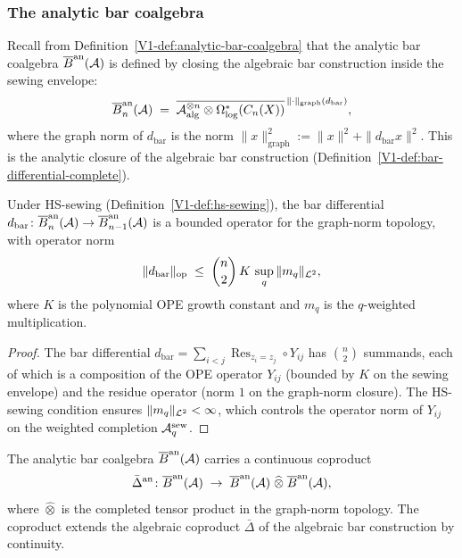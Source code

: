 \subsubsection{The analytic bar coalgebra}

\begin{definition}%
%
Recall from Definition~\ref{V1-def:analytic-bar-coalgebra} that the
analytic bar coalgebra $\overline{B}^{\mathrm{an}}(\mathcal{A})$ is defined by closing
the algebraic bar construction inside the sewing envelope:
\[
\overline{B}^{\mathrm{an}}_n(\mathcal{A})
\;=\;
\overline{
\mathcal{A}_{\mathrm{alg}}^{\otimes n}
\otimes \Omega^*_{\log}(C_n(X))
}^{\,\|\cdot\|_{\mathrm{graph}}(d_{\mathrm{bar}})},
\]
where the graph norm of $d_{\mathrm{bar}}$ is the norm
$\|x\|_{\mathrm{graph}}^2 := \|x\|^2 + \|d_{\mathrm{bar}} x\|^2$.
This is the analytic closure of the algebraic bar construction
(Definition~\ref*{V1-def:bar-differential-complete}).
\end{definition}

\begin{proposition}%
%
Under HS-sewing \textup{(}Definition~\textup{\ref{V1-def:hs-sewing}}\textup{)},
the bar differential $d_{\mathrm{bar}} \colon \overline{B}^{\mathrm{an}}_n(\mathcal{A}) \to
\overline{B}^{\mathrm{an}}_{n-1}(\mathcal{A})$ is a bounded operator for the graph-norm
topology, with operator norm
\begin{equation}%
\|d_{\mathrm{bar}}\|_{\mathrm{op}}
\;\leq\;
\binom{n}{2}\,K\,\sup_q \|m_q\|_{\hscl},
\end{equation}
where $K$ is the polynomial OPE growth constant and $m_q$ is the
$q$-weighted multiplication.
\end{proposition}

\begin{proof}
The bar differential $d_{\mathrm{bar}} = \sum_{i<j}
\operatorname{Res}_{z_i=z_j} \circ Y_{ij}$ has
$\binom{n}{2}$ summands, each of which is a composition of
the OPE operator $Y_{ij}$ (bounded by $K$ on the sewing envelope)
and the residue operator (norm $1$ on the graph-norm closure).
The HS-sewing condition ensures $\|m_q\|_{\mathcal{L}^2} < \infty$,
which controls the operator norm of $Y_{ij}$ on the weighted
completion $\mathcal{A}^{\mathrm{sew}}_q$.
\end{proof}

\begin{proposition}%
%
The analytic bar coalgebra $\overline{B}^{\mathrm{an}}(\mathcal{A})$ carries a continuous
coproduct
\begin{equation}%
\bar{\Delta}^{\mathrm{an}} \colon
\anbar(\cA)
\;\to\;
\anbar(\cA)
\;\widehat{\otimes}\;
\anbar(\cA),
\end{equation}
where $\widehat{\otimes}$ is the completed tensor product
in the graph-norm topology. The coproduct extends the algebraic
coproduct $\bar{\Delta}$ of the algebraic bar construction
by continuity.
\end{proposition}


